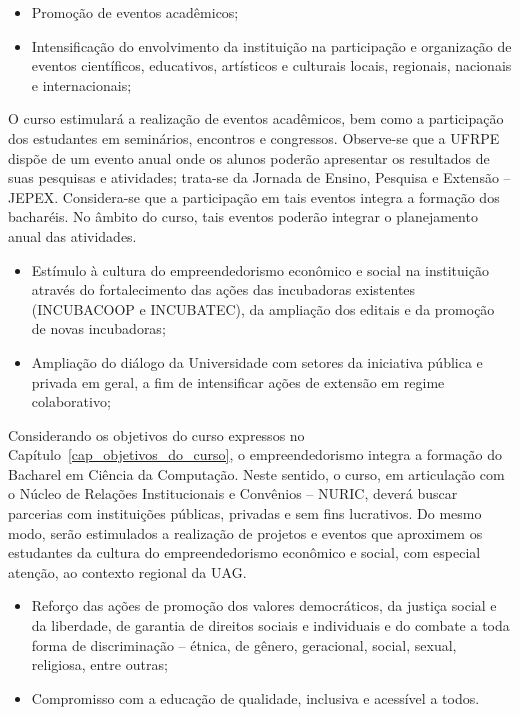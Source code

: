 \documentclass[
	12pt,				%
	openright,			%
  oneside,     %
	a4paper,			%
 hyphens,
	chapter=TITLE,		%
	english,			%
	french,				%
	spanish,			%
	brazil				%
	]{abntex2}
\begin{document}
\begin{itemize}
	\item Promoção de eventos acadêmicos;
	\item Intensificação do envolvimento da instituição na participação e organização de eventos científicos, educativos, artísticos e culturais locais, regionais, nacionais e internacionais;
\end{itemize}

O curso estimulará a realização de eventos acadêmicos, bem como a participação dos estudantes em seminários, encontros e congressos. Observe-se que a UFRPE dispõe de um evento anual onde os alunos poderão apresentar os resultados de suas pesquisas e atividades; trata-se da Jornada de Ensino, Pesquisa e Extensão – JEPEX. Considera-se que a participação em tais eventos integra a formação dos bacharéis. No âmbito do curso, tais eventos poderão integrar o planejamento anual das atividades.	 	 	

\begin{itemize}
	\item Estímulo à cultura do empreendedorismo econômico e social na instituição através do fortalecimento das ações das incubadoras existentes (INCUBACOOP e INCUBATEC), da ampliação dos editais e da promoção de novas incubadoras; 	
	\item Ampliação do diálogo da Universidade com setores da iniciativa pública e privada em geral, a fim de intensificar ações de extensão em regime colaborativo;
\end{itemize}

Considerando os objetivos do curso expressos no Capítulo~\ref{cap_objetivos_do_curso}, o empreendedorismo integra a formação do Bacharel em Ciência da Computação. Neste sentido, o curso, em articulação com o Núcleo de Relações Institucionais e Convênios – NURIC, deverá buscar parcerias com instituições públicas, privadas e sem fins lucrativos. Do mesmo modo, serão estimulados a realização de projetos e eventos que aproximem os estudantes da cultura do empreendedorismo econômico e social, com especial atenção, ao contexto regional da UAG.	 	 	

\begin{itemize}
	\item Reforço das ações de promoção dos valores democráticos, da justiça social e da liberdade, de garantia de direitos sociais e individuais e do combate a toda forma de discriminação – étnica, de gênero, geracional, social, sexual, religiosa, entre outras;
	\item Compromisso com a educação de qualidade, inclusiva e acessível a todos.
\end{itemize}
\end{document}
